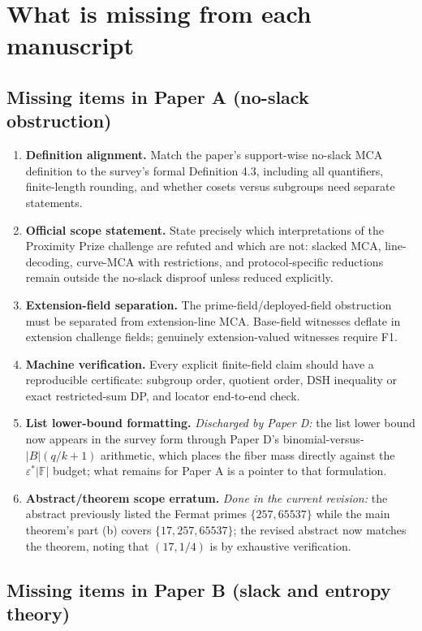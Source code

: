 \documentclass[11pt]{article}
\theoremstyle{definition}
\theoremstyle{remark}
\newcommand{\F}{\mathbb F}
\newcommand{\eps}{\varepsilon}
\newcommand{\paperA}{Paper A}
\newcommand{\paperB}{Paper B}
\newcommand{\paperD}{Paper D}
\begin{document}
\section{What is missing from each manuscript}
\label{sec:missing}

\subsection{Missing items in \paperA{} (no-slack obstruction)}

\begin{enumerate}[label=A\arabic*.,leftmargin=2.2em]
\item \textbf{Definition alignment.}  Match the paper's support-wise no-slack MCA definition to the survey's formal Definition 4.3, including all quantifiers, finite-length rounding, and whether cosets versus subgroups need separate statements.
\item \textbf{Official scope statement.}  State precisely which interpretations of the Proximity Prize challenge are refuted and which are not: slacked MCA, line-decoding, curve-MCA with restrictions, and protocol-specific reductions remain outside the no-slack disproof unless reduced explicitly.
\item \textbf{Extension-field separation.}  The prime-field/deployed-field obstruction must be separated from extension-line MCA.  Base-field witnesses deflate in extension challenge fields; genuinely extension-valued witnesses require F1.
\item \textbf{Machine verification.}  Every explicit finite-field claim should have a reproducible certificate: subgroup order, quotient order, DSH inequality or exact restricted-sum DP, and locator end-to-end check.
\item \textbf{List lower-bound formatting.}  \emph{Discharged by \paperD:} the list lower bound now appears in the survey form through \paperD's binomial-versus-$|B|(q/k+1)$ arithmetic, which places the fiber mass directly against the $\eps^*|\F|$ budget; what remains for \paperA{} is a pointer to that formulation.
\item \textbf{Abstract/theorem scope erratum.}  \emph{Done in the current revision:} the abstract previously listed the Fermat primes $\{257,65537\}$ while the main theorem's part (b) covers $\{17,257,65537\}$; the revised abstract now matches the theorem, noting that $(17,1/4)$ is by exhaustive verification.
\end{enumerate}

\subsection{Missing items in \paperB{} (slack and entropy theory)}
\end{document}
